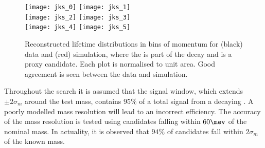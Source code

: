 \begin{figure}
  \begin{center}
    \texttt{[image: jks\_0]}
    \texttt{[image: jks\_1]}\\
    \texttt{[image: jks\_2]}
    \texttt{[image: jks\_3]}\\
    \texttt{[image: jks\_4]}
    \texttt{[image: jks\_5]}
    \caption[Validation of efficiency ratio at long lifetimes]
    {
      Reconstructed \KS lifetime distributions in bins of \KS momentum for (black) data and
      (red) simulation, where the \KS is part of the decay \decay{\Bd}{\jpsi\KS(\pipi)} and is a
      proxy \db candidate.
      Each plot is normalised to unit area.
      Good agreement is seen between the data and simulation.
    }
    \label{fig:db:syst:effrat}
  \end{center}
\end{figure}


Throughout the search it is assumed that the signal window, which extends $\pm2\sigma_m$ around
the test mass, contains $95\%$ of a total signal from a decaying \db.
A poorly modelled mass resolution will lead to an incorrect efficiency.
The accuracy of the mass resolution is tested using \btojpsikstr candidates falling within $60\mev$
of the nominal \Bd mass.
In actuality, it is observed that $94\%$ of \jpsitomumu candidates fall within $2\sigma_m$ of
the known \jpsi mass.




